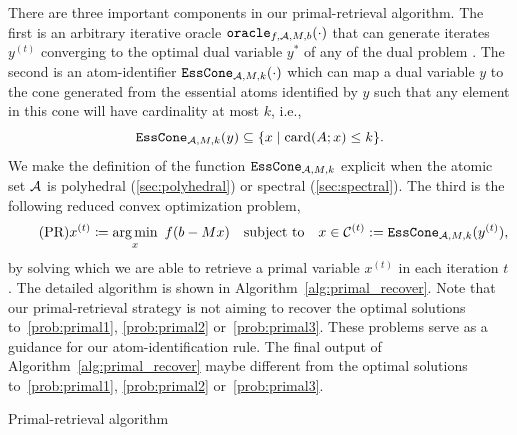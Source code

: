 There are three important components in our primal-retrieval algorithm. The first is an arbitrary iterative oracle $\texttt{oracle}_{f,\mathcal{A},M,b}(\cdot)$ that can generate iterates $y^{(t)}$ converging to the optimal dual variable $y^*$ of any of the dual problem \Drobi. The second is an atom-identifier $\texttt{EssCone}_{\mathcal{A}, M, k}(\cdot)$ which can map a dual variable $y$ to the cone generated from the essential atoms identified by $y$ such that any element in this cone will have cardinality at most $k$, i.e., 
\begin{equation} \label{eq:ess_cone}
  \texttt{EssCone}_{\mathcal{A}, M, k}(y) \subseteq \{x \mid \operatorname{card}(A; x) \leq k\}.
\end{equation}
We make the definition of the function $\texttt{EssCone}_{\mathcal{A}, M, k}$ explicit when the atomic set $\mathcal{A}$ is polyhedral (\autoref{sec:polyhedral}) or spectral (\autoref{sec:spectral}). The third is the following reduced convex optimization problem,  
\begin{equation} \label{eq:primal_recover} \tag{PR}
    x^{(t)} \coloneqq \underset{x}{\textrm{arg}\,{\min}}\enskip f(b - Mx) \hbox{\quad subject to\quad} x \in \mathcal{C}^{(t)} := \texttt{EssCone}_{\mathcal{A}, M, k}(y^{(t)}),
\end{equation}
by solving which we are able to retrieve a primal variable $x^{(t)}$ in each iteration $t$.
The detailed algorithm is shown in Algorithm~\ref{alg:primal_recover}. Note that our primal-retrieval strategy is not aiming to recover the optimal solutions to~\eqref{prob:primal1}, \eqref{prob:primal2} or~\eqref{prob:primal3}. These problems serve as a guidance for our atom-identification rule. The final output of Algorithm~\ref{alg:primal_recover} maybe different from the optimal solutions to~\eqref{prob:primal1}, \eqref{prob:primal2} or~\eqref{prob:primal3}. 

\begin{algorithm}[t]
    \DontPrintSemicolon\setcounter{AlgoLine}{-1}
    \caption{Primal-retrieval algorithm} 
    \label{alg:primal_recover}
\end{algorithm}


